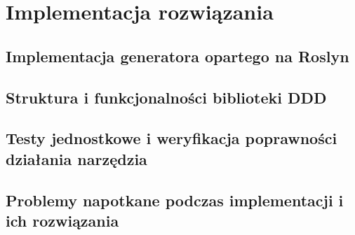 \newpage
\section{Implementacja rozwiązania}

\subsection{Implementacja generatora opartego na Roslyn}

\subsection{Struktura i funkcjonalności biblioteki DDD}

\subsection{Testy jednostkowe i weryfikacja poprawności działania narzędzia}

\subsection{Problemy napotkane podczas implementacji i ich rozwiązania}